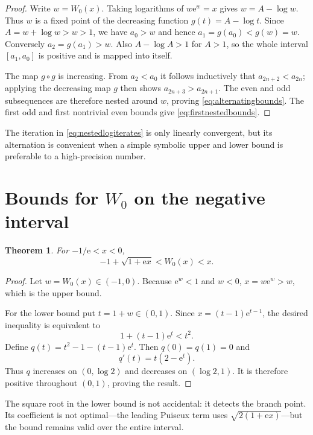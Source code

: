 \documentclass[11pt,oneside]{book}
\newtheorem{theorem}{Theorem}[chapter]
\theoremstyle{definition}
\theoremstyle{remark}
\newcommand{\ee}{\mathrm e}
\begin{document}
\begin{proof}
Write $w=W_0(x)$.  Taking logarithms of $w\ee^w=x$ gives
$w=A-\log w$.  Thus $w$ is a fixed point of the decreasing function
$g(t)=A-\log t$.  Since $A=w+\log w>w>1$, we have $a_0>w$ and hence
$a_1=g(a_0)<g(w)=w$.  Conversely $a_2=g(a_1)>w$.  Also
$A-\log A>1$ for $A>1$, so the whole interval $[a_1,a_0]$ is positive and
is mapped into itself.

The map $g\circ g$ is increasing.  From $a_2<a_0$ it follows inductively
that $a_{2n+2}<a_{2n}$; applying the decreasing map $g$ then shows
$a_{2n+3}>a_{2n+1}$.  The even and odd subsequences are therefore nested
around $w$, proving \eqref{eq:alternatingbounds}.  The first odd and first
nontrivial even bounds give \eqref{eq:firstnestedbounds}.
\end{proof}

The iteration in \eqref{eq:nestedlogiterates} is only linearly convergent,
but its alternation is convenient when a simple symbolic upper and lower
bound is preferable to a high-precision number.

\section{Bounds for $W_0$ on the negative interval}

\begin{theorem}\label{thm:w0negativebounds}
For $-1/\ee<x<0$,
\begin{equation}\label{eq:w0negativebounds}
 -1+\sqrt{1+\ee x}<W_0(x)<x.
\end{equation}
\end{theorem}

\begin{proof}
Let $w=W_0(x)\in(-1,0)$.  Because $\ee^w<1$ and $w<0$,
$x=w\ee^w>w$, which is the upper bound.

For the lower bound put $t=1+w\in(0,1)$.  Since
$x=(t-1)\ee^{t-1}$, the desired inequality is equivalent to
\[
 1+(t-1)\ee^t<t^2.
\]
Define $q(t)=t^2-1-(t-1)\ee^t$.  Then $q(0)=q(1)=0$ and
\[
 q'(t)=t(2-\ee^t).
\]
Thus $q$ increases on $(0,\log2)$ and decreases on $(\log2,1)$.
It is therefore positive throughout $(0,1)$, proving the result.
\end{proof}

The square root in the lower bound is not accidental: it detects the branch
point.  Its coefficient is not optimal---the leading Puiseux term uses
$\sqrt{2(1+\ee x)}$---but the bound remains valid over the entire interval.
\end{document}
